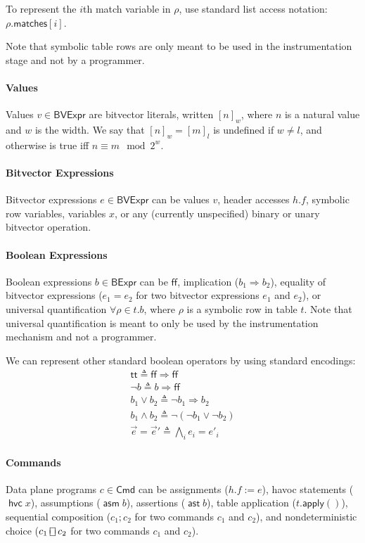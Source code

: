 \documentclass{article}
\newcommand{\TRUE}{\mathsf{tt}}
\newcommand{\FALSE}{\mathsf{ff}}
\newcommand{\BVExpr}{\mathsf{BVExpr}}
\newcommand{\BExpr}{\mathsf{BExpr}}
\newcommand{\matches}{\mathsf{matches}}
\newcommand{\assert}{\mathop{\mathsf{ast}}}
\newcommand{\assume}{\mathop{\mathsf{asm}}}
\newcommand{\apply}{\mathsf{apply}}
\newcommand{\choiceop}{\rotatebox[origin=c]{90}{$\sqsubset\!\!\!\sqsupset$}}
\newcommand{\choice}{\mathbin{\choiceop}}
\newcommand{\havoc}[1]{\mathop{\mathsf{hvc}}#1}
\begin{document}
To represent the $i$th match variable in $\rho$, use standard list
access notation: $\rho.\matches[i]$.

Note that symbolic table rows are only meant to be used in the instrumentation
stage and not by a programmer.

\paragraph{Values}
Values $v \in \BVExpr$ are bitvector literals, written $[n]_w$, where $n$
is a natural value and $w$ is the width. We say that $[n]_w = [m]_l$ is
undefined if $w \neq l$, and otherwise is true iff $n \equiv m \mod 2^w$.

\paragraph{Bitvector Expressions}
Bitvector expressions $e \in \BVExpr$ can be values $v$, header accesses $h.f$,
symbolic row variables, variables $x$, or any
(currently unspecified) binary or unary bitvector operation.

\paragraph{Boolean Expressions}
Boolean expressions $b \in \BExpr$ can be $\FALSE$, implication ($b_1
\Rightarrow b_2$), equality of bitvector expressions ($e_1 = e_2$ for two
bitvector expressions $e_1$ and $e_2$), or universal quantification $\forall
\rho \in t. b$, where $\rho$ is a symbolic row in table $t$. Note that universal
quantification is meant to only be used by the instrumentation mechanism and not
a programmer.

We can represent other standard boolean operators by using standard encodings:
\[\begin{array}{l}
  \TRUE \triangleq \FALSE \Rightarrow \FALSE \\
  \neg b \triangleq b \Rightarrow \FALSE \\
  b_1 \vee b_2 \triangleq \neg b_1 \Rightarrow b_2 \\
  b_1 \wedge b_2 \triangleq \neg(\neg b_1 \vee \neg b_2) \\
  \vec e = \vec e' \triangleq \bigwedge_i e_i = e'_i
\end{array}\]

\paragraph{Commands}
Data plane programs $c \in \mathsf{Cmd}$ can be assignments ($h.f := e$), havoc statements ($\havoc x$),
assumptions ($\assume b$), assertions ($\assert b$), table application
($t.\apply()$), sequential composition ($c_1;c_2$ for two commands $c_1$ and $c_2$), and
nondeterministic choice ($c_1 \choice c_2$ for two commands $c_1$ and $c_2$).
\end{document}

